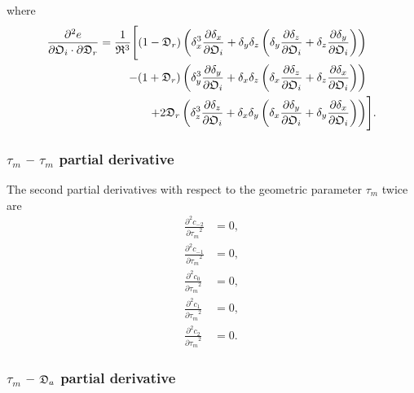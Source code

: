 \noindent where
\begin{align}
    \frac{\partial^2 e}{\partial \mathfrak{O}_i \cdot \partial \mathfrak{D}_r}  =  \frac{1}{\mathfrak{R}^3} \Bigg[
        (1 - \mathfrak{D}_r) \left(
            \delta_x^3 \frac{\partial \delta_x}{\partial \mathfrak{O}_i}
            +  \delta_y \delta_z \left( \delta_y \frac{\partial \delta_z}{\partial \mathfrak{O}_i}  +  \delta_z \frac{\partial \delta_y}{\partial \mathfrak{O}_i} \right) \right) & \nonumber \\
        -  (1 + \mathfrak{D}_r) \left(
            \delta_y^3 \frac{\partial \delta_y}{\partial \mathfrak{O}_i}
            +  \delta_x \delta_z \left( \delta_x \frac{\partial \delta_z}{\partial \mathfrak{O}_i}  +  \delta_z \frac{\partial \delta_x}{\partial \mathfrak{O}_i} \right) \right) & \nonumber \\
        +  2 \mathfrak{D}_r \left(
            \delta_z^3 \frac{\partial \delta_z}{\partial \mathfrak{O}_i}
            +  \delta_x \delta_y \left( \delta_x \frac{\partial \delta_y}{\partial \mathfrak{O}_i}  +  \delta_y \frac{\partial \delta_x}{\partial \mathfrak{O}_i} \right) \right) &
    \Bigg].
\end{align}



\subsubsection{$\tau_m$ -- $\tau_m$ partial derivative}

The second partial derivatives with respect to the geometric parameter $\tau_m$ twice are
\begin{subequations}
\begin{align}
    \frac{\partial^2 c_{-2}}{{\partial \tau_m}^2}  &=  0, \\
    \frac{\partial^2 c_{-1}}{{\partial \tau_m}^2} &= 0, \\
    \frac{\partial^2 c_{0}}{{\partial \tau_m}^2}  &= 0, \\
    \frac{\partial^2 c_{1}}{{\partial \tau_m}^2}  &= 0, \\
    \frac{\partial^2 c_{2}}{{\partial \tau_m}^2}  &= 0.
\end{align}
\end{subequations}



\subsubsection{$\tau_m$ -- $\mathfrak{D}_a$ partial derivative}

